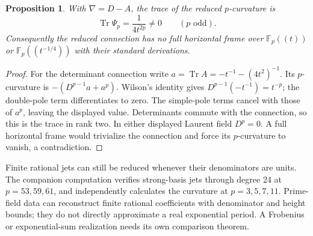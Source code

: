 \documentclass[11pt]{article}
\newtheorem{proposition}[theorem]{Proposition}
\theoremstyle{definition}
\newcommand{\Tr}{\operatorname{Tr}}
\numberwithin{equation}{section}
\begin{document}
\begin{proposition}\label{prop:pcurvature}
With $\nabla=D-A$, the trace of the reduced $p$-curvature is
\[
 \Tr\Psi_p=\frac1{4t^{2p}}\ne0\qquad(p\text{ odd}).
\]
Consequently the reduced connection has no full horizontal frame over
$\mathbb F_p((t))$ or $\mathbb F_p((t^{-1/4}))$ with their standard
derivations.
\end{proposition}
\begin{proof}
For the determinant connection write
$a=\Tr A=-t^{-1}-(4t^2)^{-1}$. Its $p$-curvature is
$-(D^{p-1}a+a^p)$. Wilson's identity gives
$D^{p-1}(-t^{-1})=t^{-p}$; the double-pole term differentiates to
zero. The simple-pole terms cancel with those of $a^p$, leaving the
displayed value. Determinants commute with the connection, so this is
the trace in rank two. In either displayed Laurent field $D^p=0$.
A full horizontal frame would trivialize the connection and force
its $p$-curvature to vanish, a contradiction.
\end{proof}

Finite rational jets can still be reduced whenever their denominators
are units. The companion computation verifies strong-basis jets through
degree 24 at $p=53,59,61$, and independently calculates the curvature
at $p=3,5,7,11$. Prime-field data can reconstruct finite rational
coefficients with denominator and height bounds; they do not directly
approximate a real exponential period. A Frobenius or exponential-sum
realization needs its own comparison theorem.



\end{document}

